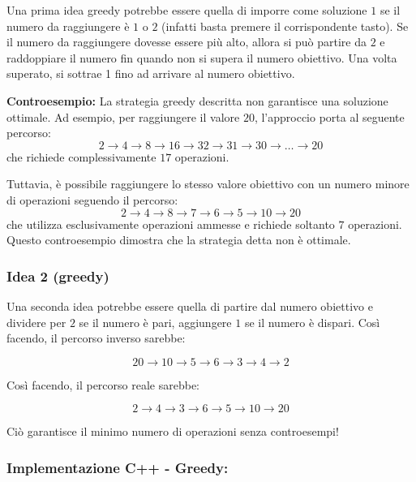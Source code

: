Una prima idea greedy potrebbe essere quella di imporre come soluzione $1$ se il numero da raggiungere è $1$ o $2$ (infatti basta premere il corrispondente tasto).
Se il numero da raggiungere dovesse essere più alto, allora si può partire da $2$ e raddoppiare il numero fin quando non si supera il numero obiettivo. Una volta superato, si sottrae 1 fino ad arrivare al numero obiettivo. 

\medskip
\noindent \textbf{Controesempio:}
La strategia greedy descritta non garantisce una soluzione ottimale.
Ad esempio, per raggiungere il valore $20$, l’approccio porta al seguente percorso:
\[
2 \rightarrow 4 \rightarrow 8 \rightarrow 16 \rightarrow 32 
\rightarrow 31 \rightarrow 30 \rightarrow \dots \rightarrow 20
\]
che richiede complessivamente $17$ operazioni.

Tuttavia, è possibile raggiungere lo stesso valore obiettivo con un numero minore di operazioni seguendo il percorso:
\[
2 \rightarrow 4 \rightarrow 8 \rightarrow 7 \rightarrow 6 \rightarrow 5 \rightarrow 10 \rightarrow 20
\]
che utilizza esclusivamente operazioni ammesse e richiede soltanto $7$ operazioni.
Questo controesempio dimostra che la strategia detta non è ottimale.

\subsubsection*{Idea 2 (greedy)}

Una seconda idea potrebbe essere quella di partire dal numero obiettivo e dividere per $2$ se il numero è pari, aggiungere $1$ se il numero è dispari. 
Così facendo, il percorso inverso sarebbe:

\[20 \rightarrow 10 \rightarrow 5 \rightarrow 6 \rightarrow 3 \rightarrow 4 \rightarrow 2\]

Così facendo, il percorso reale sarebbe:

\[2 \rightarrow 4 \rightarrow 3 \rightarrow 6 \rightarrow 5 \rightarrow 10 \rightarrow 20\]

Ciò garantisce il minimo numero di operazioni senza controesempi!

\subsubsection*{Implementazione C++ - Greedy:}


